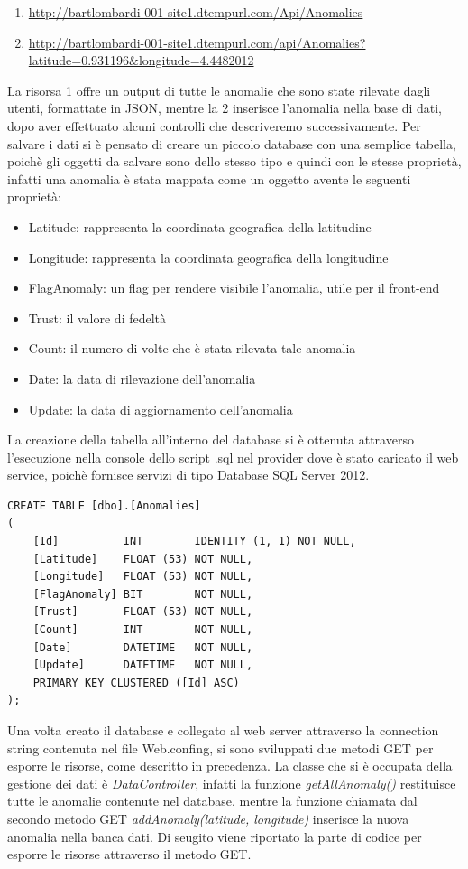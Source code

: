 \documentclass[a4paper, 11pt]{article} %
\begin{document}
\begin{enumerate}
	\item \url{http://bartlombardi-001-site1.dtempurl.com/Api/Anomalies}
	\item \url{http://bartlombardi-001-site1.dtempurl.com/api/Anomalies?latitude=0.931196\&longitude=4.4482012}
\end{enumerate}
La risorsa 1 offre un output di tutte le anomalie che sono state rilevate dagli utenti, formattate in JSON, mentre la 2 inserisce l'anomalia nella base di dati, dopo aver effettuato alcuni controlli che descriveremo successivamente. Per salvare i dati si è pensato di creare un piccolo database con una semplice tabella, poichè gli oggetti da salvare sono dello stesso tipo e quindi con le stesse proprietà, infatti una anomalia è stata mappata come un oggetto avente le seguenti proprietà:
\begin{itemize}
	\item Latitude: rappresenta la coordinata geografica della latitudine
	\item Longitude: rappresenta la coordinata geografica della longitudine
	\item FlagAnomaly: un flag per rendere visibile l'anomalia, utile per il front-end
	\item Trust: il valore di fedeltà
	\item Count: il numero di volte che è stata rilevata tale anomalia
	\item Date: la data di rilevazione dell'anomalia
	\item Update: la data di aggiornamento dell'anomalia
\end{itemize}
La creazione della tabella all'interno del database si è ottenuta attraverso l'esecuzione nella console dello script .sql nel provider dove è stato caricato il web service, poichè fornisce servizi di tipo Database SQL Server 2012.
\begin{verbatim}
CREATE TABLE [dbo].[Anomalies] 
(
    [Id]          INT        IDENTITY (1, 1) NOT NULL,
    [Latitude]    FLOAT (53) NOT NULL,
    [Longitude]   FLOAT (53) NOT NULL,
    [FlagAnomaly] BIT        NOT NULL,
    [Trust]       FLOAT (53) NOT NULL,
    [Count]       INT        NOT NULL,
    [Date]        DATETIME   NOT NULL,
    [Update]      DATETIME   NOT NULL,
    PRIMARY KEY CLUSTERED ([Id] ASC)
);
\end{verbatim}
Una volta creato il database e collegato al web server attraverso la connection string contenuta nel file Web.confing, si sono sviluppati due metodi GET per esporre le risorse, come descritto in precedenza. La classe che si è occupata della gestione dei dati è \textit{DataController}, infatti la funzione \textit{getAllAnomaly()} restituisce tutte le anomalie contenute nel database, mentre la funzione chiamata dal secondo metodo GET \textit{addAnomaly(latitude, longitude)} inserisce la nuova anomalia nella banca dati. Di seugito viene riportato la parte di codice per esporre le risorse attraverso il metodo GET.
\end{document}
